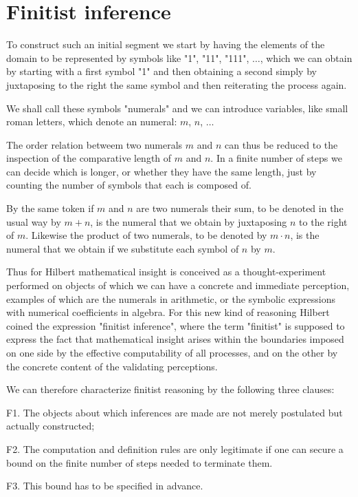 \documentclass[12pt]{article}
\begin{document}
\section{Finitist inference}\normalsize

To construct such an initial segment we start by having the elements of the domain to be represented by symbols like "1", "11", "111", $\ldots$, which we can obtain by starting with a first symbol "1" and then obtaining a second simply by juxtaposing to the right the same symbol and then reiterating the process again.

We shall call these symbols "numerals" and we can introduce variables, like small roman letters, which denote an numeral: $m$, $n$, $\ldots$

The order relation betweem two numerals $m$ and $n$ can thus be reduced to the inspection of the comparative length of $m$ and $n$. In a finite number of steps we can decide which is longer, or whether they have the same length, just by counting the number of symbols that each is composed of.

By the same token if $m$ and $n$ are two numerals their sum, to be denoted in the usual way by $m + n$, is the numeral that we obtain by juxtaposing $n$ to the right of $m$. Likewise the product of two numerals, to be denoted by $m \cdot n$, is the numeral that we obtain if we substitute each symbol of $n$ by $m$.

Thus for Hilbert mathematical insight is conceived as a thought-experiment performed on objects of which we can have a concrete and immediate perception, examples of which are the numerals in arithmetic, or the symbolic expressions with numerical coefficients in algebra. For this new kind of reasoning Hilbert coined the expression "finitist inference",  where the term "finitist" is supposed to express the fact that mathematical insight arises within the boundaries imposed on one side by the effective computability of all processes, and on the other by the concrete content of the validating perceptions.

We can therefore characterize finitist reasoning by the following three clauses:
   
F1. The objects about which inferences are made are not merely postulated but actually constructed;

F2. The computation and definition rules are only legitimate if one can secure a bound on the finite number of steps needed to terminate them.

F3. This bound has to be specified in advance.
\end{document}
